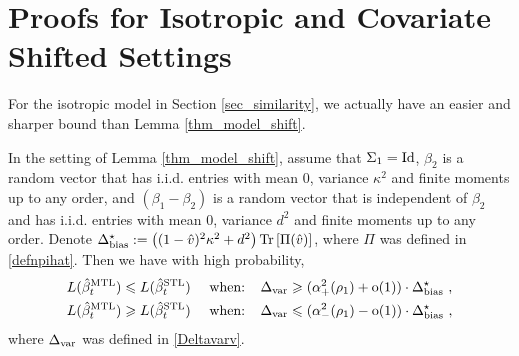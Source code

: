 \section{Proofs for Isotropic and Covariate Shifted Settings}\label{app_iso_cov}

For the isotropic model in Section \ref{sec_similarity}, we actually have an easier and sharper bound than Lemma \ref{thm_model_shift}. %
\begin{lemma}\label{prop_model_shift_tight}
		In the setting of Lemma \ref{thm_model_shift}, assume that $\Sigma_1 =\operatorname{Id}$,
		$\beta_2$ is a random vector that has i.i.d. entries with mean $0$, variance $\kappa^2$ and finite moments up to any order, and $(\beta_1-\beta_2)$ is a random vector that is independent of $\beta_2$ and has i.i.d. entries with mean $0$, variance $d^2$ and finite moments up to any order. Denote
		$\Delta^\star_{\text{bias}} := \left({(1 - \hat{v})^2 \kappa^2 + d^2}\right) \operatorname{Tr}\left[\Pi(\hat v)\right]$, where $\Pi$ was defined in \eqref{defnpihat}.	Then we have with high probability,
		\begin{align*}
			L(\hat{\beta}_t^{\text{MTL}}) \leqslant L(\hat{\beta}_t^{\text{STL}})\quad \text{ when: }\ \  & \Delta_{\text{var}} \geqslant  (\alpha_+^2(\rho_1)+\operatorname{o}(1))\cdot  \Delta^\star_{\text{bias}} \ , \\
			L(\hat{\beta}_t^{\text{MTL}}) \geqslant L(\hat{\beta}_t^{\text{STL}})\quad \text{ when: }\ \  & \Delta_{\text{var}} \leqslant (\alpha_-^2(\rho_1)-\operatorname{o}(1))\cdot  \Delta^\star_{\text{bias}}\ ,
		\end{align*}
		where $\Delta_{\text{var}}$ was defined in \eqref{Deltavarv}.
\end{lemma}

